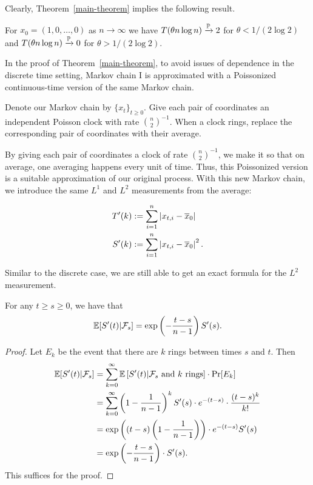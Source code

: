 \documentclass[12pt]{article}
\begin{document}
Clearly, Theorem~\ref{main-theorem} implies the following result. 

\begin{cor}
	For $x_0 = (1, 0, \ldots, 0)$ as $n \to \infty$ we have $T(\theta n \log n) \xrightarrow{\mathbb{P}} 2$ for $\theta < 1/(2 \log 2)$ and $T(\theta n \log n) \xrightarrow{\mathbb{P}} 0$ for $\theta > 1/(2 \log 2)$. 
\end{cor}

In the proof of Theorem~\ref{main-theorem}, to avoid issues of dependence in the discrete time setting, Markov chain I is approximated with a Poissonized continuous-time version of the same Markov chain. 

\begin{defn}
	Denote our Markov chain by $\{x_t\}_{t \geq 0}$. Give each pair of coordinates an independent Poisson clock with rate $\binom{n}{2}^{-1}$. When a clock rings, replace the corresponding pair of coordinates with their average. 
\end{defn}

By giving each pair of coordinates a clock of rate $\binom{n}{2}^{-1}$, we make it so that on average, one averaging happens every unit of time. Thus, this Poissonized version is a suitable approximation of our original process. With this new Markov chain, we introduce the same $L^1$ and $L^2$ measurements from the average:

\begin{align*}
	T'(k) & := \sum_{i = 1}^n \left | x_{t, i} - \overline{x}_0 \right | \\
	S'(k) & := \sum_{i = 1}^n \left | x_{t, i} - \overline{x}_0 \right |^2.
\end{align*}

Similar to the discrete case, we are still able to get an exact formula for the $L^2$ measurement. 

\begin{prop}
	For any $t \geq s \geq 0$, we have that 
	\[
		\mathbb{E}[S'(t) | \mathcal{F}_s ] = \exp \left ( - \frac{t-s}{n-1} \right ) S'(s).	
	\]
\end{prop}
\begin{proof}
	Let $E_k$ be the event that there are $k$ rings between times $s$ and $t$. Then 
	\begin{align*}
		\mathbb{E} [ S'(t) | \mathcal{F}_s ] & = \sum_{k = 0}^\infty \mathbb{E} \left [ S'(t) | \mathcal{F}_s \text{ and $k$ rings} \right ] \cdot \Pr[E_k] \\
		& = \sum_{k = 0}^\infty \left ( 1 - \frac{1}{n-1} \right )^k S'(s) \cdot e^{-(t-s)} \cdot \frac{(t-s)^k}{k!} \\
		& = \exp \left (  (t-s) \left ( 1 - \frac{1}{n-1} \right ) \right ) \cdot e^{-(t-s)} S'(s) \\
		& = \exp \left ( - \frac{t-s}{n-1} \right ) \cdot S'(s). 
	\end{align*}
	This suffices for the proof. 
\end{proof}
\end{document}
